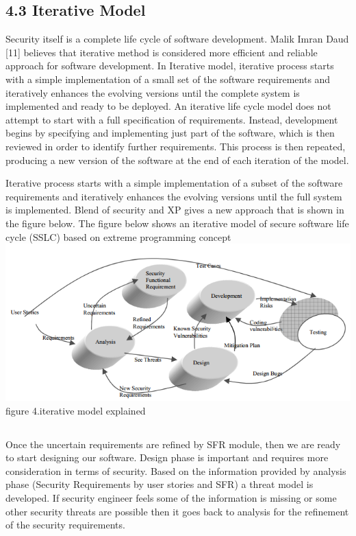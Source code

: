 \documentclass[12pt]{extreport}
\begin{document}
\subsection*{4.3	Iterative Model}
Security itself is a complete life cycle of software development. Malik Imran Daud [11] believes that iterative method is considered more efficient and reliable approach for software development. In Iterative model, iterative process starts with a simple implementation of a small set of the software requirements and iteratively enhances the evolving versions until the complete system is implemented and ready to be deployed. An iterative life cycle model does not attempt to start with a full specification of requirements. Instead, development begins by specifying and implementing just part of the software, which is then reviewed in order to identify further requirements. This process is then repeated, producing a new version of the software at the end of each iteration of the model.

Iterative process starts with a simple implementation of a subset of the software requirements and iteratively enhances the evolving versions until the full system is implemented. Blend of security and XP gives a new approach that is shown in the figure below. The figure below shows an iterative model of secure software life cycle (SSLC) based on extreme programming concept
\includegraphics*{image4}
\label{image} figure 4.{iterative model explained}

\subsection*{}
Once the uncertain requirements are refined by SFR module, then we are ready to start designing our software. Design phase is important and requires more consideration in terms of security. Based on the information provided by analysis phase (Security Requirements by user stories and SFR) a threat model is developed. If security engineer feels some of the information is missing or some other security threats are possible then it goes back to analysis for the refinement of the security requirements.
\end{document}
